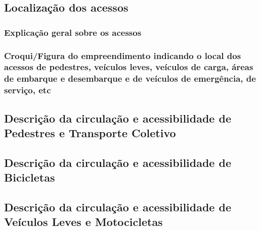 \documentclass[]{article}
\begin{document}
\hypertarget{localizauxe7uxe3o-dos-acessos}{%
\subsection{Localização dos
acessos}\label{localizauxe7uxe3o-dos-acessos}}

\hypertarget{explicauxe7uxe3o-geral-sobre-os-acessos}{%
\subsubsection{Explicação geral sobre os
acessos}\label{explicauxe7uxe3o-geral-sobre-os-acessos}}

\hypertarget{croquifigura-do-empreendimento-indicando-o-local-dos-acessos-de-pedestres-veuxedculos-leves-veuxedculos-de-carga-uxe1reas-de-embarque-e-desembarque-e-de-veuxedculos-de-emerguxeancia-de-serviuxe7o-etc}{%
\subsubsection{Croqui/Figura do empreendimento indicando o local dos
acessos de pedestres, veículos leves, veículos de carga, áreas de
embarque e desembarque e de veículos de emergência, de serviço,
etc}\label{croquifigura-do-empreendimento-indicando-o-local-dos-acessos-de-pedestres-veuxedculos-leves-veuxedculos-de-carga-uxe1reas-de-embarque-e-desembarque-e-de-veuxedculos-de-emerguxeancia-de-serviuxe7o-etc}}

\hypertarget{descriuxe7uxe3o-da-circulauxe7uxe3o-e-acessibilidade-de-pedestres-e-transporte-coletivo}{%
\subsection{Descrição da circulação e acessibilidade de Pedestres e
Transporte
Coletivo}\label{descriuxe7uxe3o-da-circulauxe7uxe3o-e-acessibilidade-de-pedestres-e-transporte-coletivo}}

\hypertarget{descriuxe7uxe3o-da-circulauxe7uxe3o-e-acessibilidade-de-bicicletas}{%
\subsection{Descrição da circulação e acessibilidade de
Bicicletas}\label{descriuxe7uxe3o-da-circulauxe7uxe3o-e-acessibilidade-de-bicicletas}}

\hypertarget{descriuxe7uxe3o-da-circulauxe7uxe3o-e-acessibilidade-de-veuxedculos-leves-e-motocicletas}{%
\subsection{Descrição da circulação e acessibilidade de Veículos Leves e
Motocicletas}\label{descriuxe7uxe3o-da-circulauxe7uxe3o-e-acessibilidade-de-veuxedculos-leves-e-motocicletas}}
\end{document}
